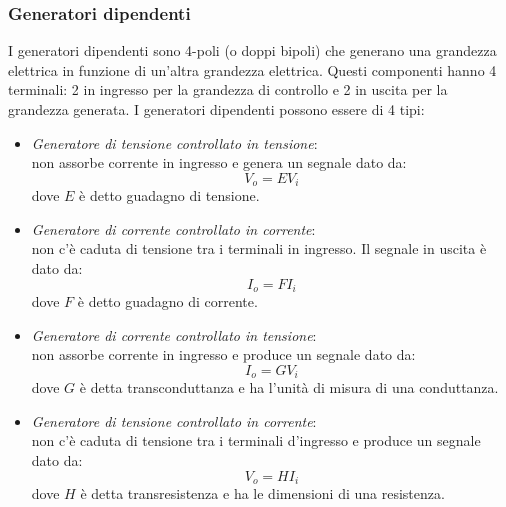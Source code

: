 \documentclass{article}
\begin{document}
\subsubsection{Generatori dipendenti}
I generatori dipendenti sono 4-poli (o doppi bipoli) che generano una grandezza elettrica in funzione di un'altra grandezza elettrica. Questi componenti hanno 4 terminali: 2 in ingresso per la grandezza di controllo e 2 in uscita per la grandezza generata. I generatori dipendenti possono essere di 4 tipi:
\begin{itemize}
    \item \textit{Generatore di tensione controllato in tensione}: \\
    non assorbe corrente in ingresso e genera un segnale dato da: $$ V_o=EV_i $$ dove $E$ è detto guadagno di tensione.\\

    \item \textit{Generatore di corrente controllato in corrente}:\\
    non c'è caduta di tensione tra i terminali in ingresso. Il segnale in uscita è dato da:
    $$ I_o=FI_i $$
    dove $F$ è detto guadagno di corrente.

    \item \textit{Generatore di corrente controllato in tensione}:\\
    non assorbe corrente in ingresso e produce un segnale dato da:
    $$ I_o=GV_i $$
    dove $G$ è detta transconduttanza e ha l'unità di misura di una conduttanza.

    \item \textit{Generatore di tensione controllato in corrente}:\\
    non c'è caduta di tensione tra i terminali d'ingresso e produce un segnale dato da:
    $$ V_o=HI_i $$
    dove $H$ è detta transresistenza e ha le dimensioni di una resistenza.
    
\end{itemize}
\end{document}
